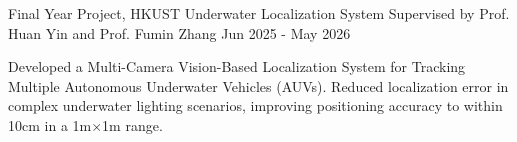 \cventry
{Final Year Project, HKUST} %
{Underwater Localization System} %
{Supervised by Prof. Huan Yin and Prof. Fumin Zhang} %
{Jun 2025 - May 2026} %
\begin{cvitems}
\item {Developed a Multi-Camera Vision-Based Localization System for Tracking Multiple Autonomous Underwater Vehicles (AUVs). Reduced localization error in complex underwater lighting scenarios, improving positioning accuracy to within 10cm in a 1m$\times$1m range.}
\end{cvitems}
